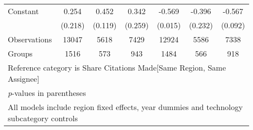 \begin{sidewaystable}[htbp]
\begin{tabular}{l*{6}{c}}
Constant        &    0.254&    0.452&    0.342&   -0.569&   -0.396&   -0.567\\
                &  (0.218)&  (0.119)&  (0.259)&  (0.015)&  (0.232)&  (0.092)\\
\hline
Observations    &    13047&     5618&     7429&    12924&     5586&     7338\\
Groups          &     1516&      573&      943&     1484&      566&      918\\
\hline\hline
\multicolumn{7}{l}{\footnotesize Reference category is Share Citations Made[Same Region, Same Assignee]}\\
\multicolumn{7}{l}{\footnotesize \textit{p}-values in parentheses}\\
\multicolumn{7}{l}{\footnotesize All models include region fixed effects, year dummies and technology subcategory controls}\\
\end{tabular}
\end{sidewaystable}
